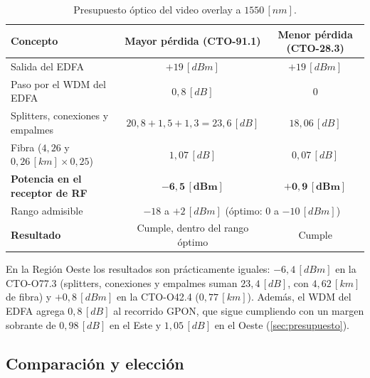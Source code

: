 \begin{table}[H]
    \centering
    \footnotesize
    \caption{Presupuesto óptico del video overlay a $1550 \, [nm]$.}
    \label{tab:overlay}
    \begin{tabular}{|l|c|c|}
        \hline
        \textbf{Concepto} & \textbf{Mayor pérdida (CTO-91.1)} & \textbf{Menor pérdida (CTO-28.3)} \\
        \hline
        Salida del EDFA & $+19 \, [dBm]$ & $+19 \, [dBm]$ \\
        Paso por el WDM del EDFA & $0{,}8 \, [dB]$ & $0$ \\
        Splitters, conexiones y empalmes & $20{,}8 + 1{,}5 + 1{,}3 = 23{,}6 \, [dB]$ & $18{,}06 \, [dB]$ \\
        Fibra ($4{,}26$ y $0{,}26 \, [km] \times 0{,}25$) & $1{,}07 \, [dB]$ & $0{,}07 \, [dB]$ \\
        \hline
        \textbf{Potencia en el receptor de RF} & $\mathbf{-6{,}5 \, [dBm]}$ & $\mathbf{+0{,}9 \, [dBm]}$ \\
        Rango admisible & \multicolumn{2}{c|}{$-18$ a $+2 \, [dBm]$ (óptimo: $0$ a $-10 \, [dBm]$)} \\
        \hline
        \textbf{Resultado} & Cumple, dentro del rango óptimo & Cumple \\
        \hline
    \end{tabular}
\end{table}

En la Región Oeste los resultados son prácticamente iguales: $-6{,}4 \, [dBm]$ en la CTO-O77.3 (splitters, conexiones y empalmes suman $23{,}4 \, [dB]$, con $4{,}62 \, [km]$ de fibra) y $+0{,}8 \, [dBm]$ en la CTO-O42.4 ($0{,}77 \, [km]$). Además, el WDM del EDFA agrega $0{,}8 \, [dB]$ al recorrido GPON, que sigue cumpliendo con un margen sobrante de $0{,}98 \, [dB]$ en el Este y $1{,}05 \, [dB]$ en el Oeste (\autoref{sec:presupuesto}).

\subsection{Comparación y elección}
\label{sec:tv_eleccion}

